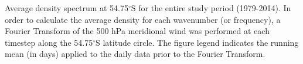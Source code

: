 \label{fig:fourier_spectrum}
Average density spectrum at 54.75$^{\circ}$S for the entire study period (1979-2014). In order to calculate the average density for each wavenumber (or frequency), a Fourier Transform of the 500 hPa meridional wind was performed at each timestep along the 54.75$^{\circ}$S latitude circle. The figure legend indicates the running mean (in days) applied to the daily data prior to the Fourier Transform. 